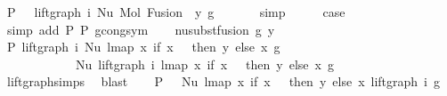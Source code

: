 \begin{isabellebody}
\ P{}{\isacharcolon}{\kern0pt}\ {\isachardoublequoteopen}{\isachardot}{\kern0pt}{\isachardot}{\kern0pt}{\isachardot}{\kern0pt}\ {\isacharequal}{\kern0pt}\ lift{\isacharunderscore}{\kern0pt}graph\ i\ {\isacharparenleft}{\kern0pt}Nu\ {\isacharparenleft}{\kern0pt}Mol\ {\isacharparenleft}{\kern0pt}Fusion\ {}\ y{\isacharparenright}{\kern0pt}\ g{\isacharparenright}{\kern0pt}{\isacharparenright}{\kern0pt}{\isachardoublequoteclose}\isanewline
\ \ \ \ \ \isamarkupfalse%
\ simp\isanewline
\ \ \isamarkupfalse%
\ \isamarkupfalse%
\ {\isacharquery}{\kern0pt}case\isanewline
\ \ \ \ \ \isamarkupfalse%
\ {\isacharparenleft}{\kern0pt}simp\ add{\isacharcolon}{\kern0pt}\ P{}\ P{}\ gcong{\isachardot}{\kern0pt}sym{\isacharparenright}{\kern0pt}\isanewline
{}\isamarkupfalse%
\isanewline
\ \ \isamarkupfalse%
\ {\isacharparenleft}{\kern0pt}nu{\isacharunderscore}{\kern0pt}subst{\isacharunderscore}{\kern0pt}fusion{}\ g\ y{\isacharparenright}{\kern0pt}\isanewline
\ \ \isamarkupfalse%
\ P{}{\isacharcolon}{\kern0pt}\ {\isachardoublequoteopen}lift{\isacharunderscore}{\kern0pt}graph\ i\ {\isacharparenleft}{\kern0pt}Nu\ {\isacharparenleft}{\kern0pt}lmap\ {\isacharparenleft}{\kern0pt}{\isasymlambda}x{\isachardot}{\kern0pt}\ if\ x\ {\isacharequal}{\kern0pt}\ {}\ then\ y\ else\ x{\isacharparenright}{\kern0pt}\ g{\isacharparenright}{\kern0pt}{\isacharparenright}{\kern0pt}\ {\isacharequal}{\kern0pt}\isanewline
\ \ \ \ \ \ \ \ \ \ \ \ Nu\ {\isacharparenleft}{\kern0pt}lift{\isacharunderscore}{\kern0pt}graph\ i\ {\isacharparenleft}{\kern0pt}lmap\ {\isacharparenleft}{\kern0pt}{\isasymlambda}x{\isachardot}{\kern0pt}\ if\ x\ {\isacharequal}{\kern0pt}\ {}\ then\ y\ else\ x{\isacharparenright}{\kern0pt}\ g{\isacharparenright}{\kern0pt}{\isacharparenright}{\kern0pt}{\isachardoublequoteclose}\isanewline
\ \ \ \ \ \ \isamarkupfalse%
\ lift{\isacharunderscore}{\kern0pt}graph{\isachardot}{\kern0pt}simps{\isacharparenleft}{\kern0pt}{}{\isacharparenright}{\kern0pt}\ \isamarkupfalse%
\ blast\isanewline
\ \ \isamarkupfalse%
\ P{}{\isacharcolon}{\kern0pt}\ {\isachardoublequoteopen}{\isachardot}{\kern0pt}{\isachardot}{\kern0pt}{\isachardot}{\kern0pt}\ {\isacharequal}{\kern0pt}\ Nu\ {\isacharparenleft}{\kern0pt}lmap\ {\isacharparenleft}{\kern0pt}{\isasymlambda}x{\isachardot}{\kern0pt}\ if\ x\ {\isacharequal}{\kern0pt}\ {}\ then\ y\ else\ x{\isacharparenright}{\kern0pt}\ {\isacharparenleft}{\kern0pt}lift{\isacharunderscore}{\kern0pt}graph\ i\ g{\isacharparenright}{\kern0pt}{\isacharparenright}{\kern0pt}{\isachardoublequoteclose}\isanewline

\end{isabellebody}
